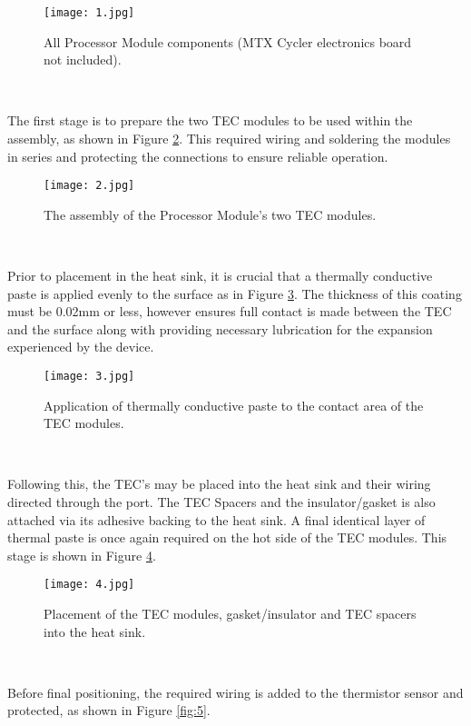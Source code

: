 \begin{figure}[!htb]
	\centering
	\texttt{[image: 1.jpg]}
	\caption[Processor Module Components.]{All Processor Module components (MTX Cycler electronics board not included).}
	\label{fig:1}
\end{figure} 
\FloatBarrier

The first stage is to prepare the two TEC modules to be used within the assembly, as shown in Figure \ref{fig:2}. This required wiring and soldering the modules in series and protecting the connections to ensure reliable operation.

\begin{figure}[!htb]
	\centering
	\texttt{[image: 2.jpg]}
	\caption[TEC Module connection.]{The assembly of the Processor Module's two TEC modules.}
	\label{fig:2}
\end{figure} 
\FloatBarrier

Prior to placement in the heat sink, it is crucial that a thermally conductive paste is applied evenly to the surface as in Figure \ref{fig:3}. The thickness of this coating must be 0.02mm or less, however ensures full contact is made between the TEC and the surface along with providing necessary lubrication for the expansion experienced by the device.

\begin{figure}[!htb]
	\centering
	\texttt{[image: 3.jpg]}
	\caption[Heat sink thermal paste application.]{Application of thermally conductive paste to the contact area of the TEC modules.}
	\label{fig:3}
\end{figure} 
\FloatBarrier

Following this, the TEC's may be placed into the heat sink and their wiring directed through the port. The TEC Spacers and the insulator/gasket is also attached via its adhesive backing to the heat sink. A final identical layer of thermal paste is once again required on the hot side of the TEC modules. This stage is shown in Figure \ref{fig:4}.

\begin{figure}[!htb]
	\centering
	\texttt{[image: 4.jpg]}
	\caption[Heat sink component assembly.]{Placement of the TEC modules, gasket/insulator and TEC spacers into the heat sink.}
	\label{fig:4}
\end{figure} 
\FloatBarrier

Before final positioning, the required wiring is added to the thermistor sensor and protected, as shown in Figure \ref{fig:5}.

